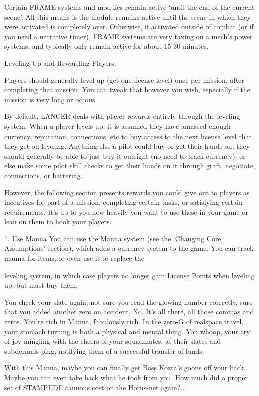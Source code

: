 Certain FRAME systems and modules remain active ‘until the end of the current scene’. All this
means is the module remains active until the scene in which they were activated is completely
over. Otherwise, if activated outside of combat (or if you need a narrative timer), FRAME systems
are very taxing on a mech’s power systems, and typically only remain active for about 15-30
minutes.


                                 Leveling Up and Rewarding Players.

Players should generally level up (get one license level) once per mission, after completing that
mission. You can tweak that however you wish, especially if the mission is very long or odious.


By default, LANCER deals with player rewards entirely through the leveling system. When a
player levels up, it is assumed they have amassed enough currency, reputation, connections, etc
to buy access to the next license level that they get on leveling. Anything else a pilot could buy
or get their hands on, they should generally be able to just buy it outright (no need to track
currency), or else make some pilot skill checks to get their hands on it through graft, negotiate,
connections, or bartering.


However, the following section presents rewards you could give out to players as incentives for
part of a mission, completing certain tasks, or satisfying certain requirements. It’s up to you how
heavily you want to use these in your game or lean on them to hook your players.


1. Use Manna
You can use the Manna system (see the ‘Changing Core Assumptions’ section), which adds a
currency system to the game. You can track manna for items, or even use it to replace the




leveling system, in which case players no longer gain License Points when leveling up, but must
buy them.


You check your slate again, not sure you read the glowing number correctly, sure that you added
another zero on accident. No. It’s all there, all those commas and zeros. You’re rich in Manna,
fabulously rich. In the zero-G of realspace travel, your stomach turning is both a physical and
mental thing. You whoop, your cry of joy mingling with the cheers of your squadmates, as their
slates and subdermals ping, notifying them of a successful transfer of funds.

With this Manna, maybe you can finally get Boss Kozta’s goons off your back. Maybe you can
even take back what he took from you. How much did a proper set of STAMPEDE cannons cost
on the Horus-net again?...

